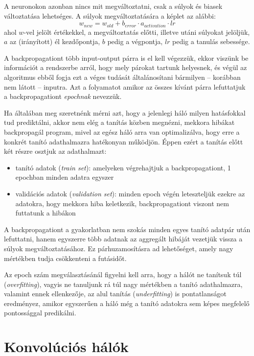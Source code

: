 A neuronokon azonban nincs mit megváltoztatni, csak a súlyok és biasek változtatása lehetséges. A súlyok megváltoztatására a képlet az alábbi:
$$ w_{new} =  w_{old} + b_{error} \cdot a_{activation} \cdot lr $$
ahol $w$-vel jelölt értékekkel, a megváltoztatás előtti, illetve utáni súlyokat jelöljük, $a$ az (irányított) él kezdőpontja, $b$ pedig a végpontja, $lr$ pedig a tanulás sebessége.

A backpropagationt több input-output párra is el kell végezzük, ekkor viszünk be információt a rendszerbe arról, hogy mely párokat tartunk helyesnek, és végül az algoritmus ebből fogja ezt a véges tudását általánosítani bármilyen -- korábban nem látott -- inputra. Azt a folyamatot amikor az összes kívánt párra lefuttatjuk a backpropagationt \emph{epochnak} nevezzük. 

Ha általában meg szeretnénk mérni azt, hogy a jelenlegi háló milyen hatásfokkal tud prediktálni, akkor nem elég a tanítás közben megnézni, mekkora hibákat backpropagál program, mivel az egész háló arra van optimalizálva, hogy erre a konkrét tanító adathalmazra hatékonyan működjön. Éppen ezért a tanítás előtt két részre osztjuk az adathalmazt:

\begin{itemize}  
	\item tanító adatok (\emph{train set}): amelyeken végrehajtjuk a backpropagationt, 1 epochban minden adatra egyszer
	\item validációs adatok (\emph{validation set}): minden epoch végén leteszteljük ezekre az adatokra, hogy mekkora hiba keletkezik, backpropagationt viszont nem futtatunk a hibákon
\end{itemize}

A backpropagationt a gyakorlatban nem szokás minden egyes tanító adatpár után lefuttatni, hanem egyszerre több adatnak az aggregált hibáját vezetjük vissza a súlyok megváltoztatásához. Ez párhuzamosításra ad lehetőséget, amely nagy mértékben tudja csökkenteni a futásidőt.

Az epoch szám megválasztásánál figyelni kell arra, hogy a hálót ne tanítsuk túl (\emph{overfitting}), vagyis ne tanuljunk rá túl nagy mértékben a tanító adathalmazra, valamint ennek ellenkezője, az alul tanítás (\emph{underfitting}) is pontatlanságot eredményez, amikor egyszerűen a háló még a tanító adatokra sem képes megfelelő pontossággal predikálni.

\section{Konvolúciós hálók}

